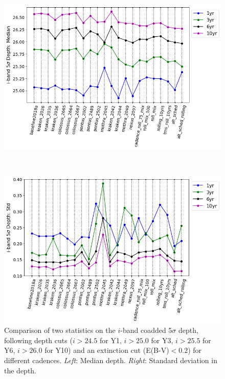 \begin{figure}[H]
	\vspace*{2em}
	\begin{minipage}{.4\paperwidth}
		\includegraphics[width=.42\paperwidth, trim={5 20 105 10},clip=true]{figures/lss_compare_depth_median_22dbs.png}
	\end{minipage}\
	\hspace*{1em}
	\begin{minipage}{.4\paperwidth}
		\includegraphics[width=.42\paperwidth, trim={5 20 80 10},clip=false]{figures/lss_compare_depth_std_22dbs.png}
	\end{minipage}
	\vspace*{1em}
	\caption{Comparison of two statistics on the $i$-band coadded 5$\sigma$ depth, following depth cuts ($i>24.5$ for Y1, $i>25.0$ for Y3, $i>25.5$ for Y6, $i>26.0$ for Y10) and an extinction cut (E(B-V)$<0.2$) for different cadences. \textit{Left}: Median depth. \textit{Right}: Standard deviation in the depth.}
\label{fig: compare_depth}
\end{figure}

